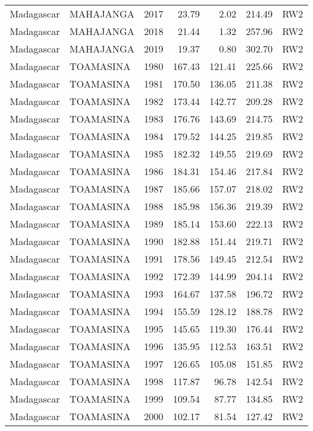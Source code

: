 \begin{longtable}{lllrrrl}
  Madagascar & MAHAJANGA & 2017 & 23.79 & 2.02 & 214.49 & RW2 \\ 
  Madagascar & MAHAJANGA & 2018 & 21.44 & 1.32 & 257.96 & RW2 \\ 
  Madagascar & MAHAJANGA & 2019 & 19.37 & 0.80 & 302.70 & RW2 \\ 
  Madagascar & TOAMASINA & 1980 & 167.43 & 121.41 & 225.66 & RW2 \\ 
  Madagascar & TOAMASINA & 1981 & 170.50 & 136.05 & 211.38 & RW2 \\ 
  Madagascar & TOAMASINA & 1982 & 173.44 & 142.77 & 209.28 & RW2 \\ 
  Madagascar & TOAMASINA & 1983 & 176.76 & 143.69 & 214.75 & RW2 \\ 
  Madagascar & TOAMASINA & 1984 & 179.52 & 144.25 & 219.85 & RW2 \\ 
  Madagascar & TOAMASINA & 1985 & 182.32 & 149.55 & 219.69 & RW2 \\ 
  Madagascar & TOAMASINA & 1986 & 184.31 & 154.46 & 217.84 & RW2 \\ 
  Madagascar & TOAMASINA & 1987 & 185.66 & 157.07 & 218.02 & RW2 \\ 
  Madagascar & TOAMASINA & 1988 & 185.98 & 156.36 & 219.39 & RW2 \\ 
  Madagascar & TOAMASINA & 1989 & 185.14 & 153.60 & 222.13 & RW2 \\ 
  Madagascar & TOAMASINA & 1990 & 182.88 & 151.44 & 219.71 & RW2 \\ 
  Madagascar & TOAMASINA & 1991 & 178.56 & 149.45 & 212.54 & RW2 \\ 
  Madagascar & TOAMASINA & 1992 & 172.39 & 144.99 & 204.14 & RW2 \\ 
  Madagascar & TOAMASINA & 1993 & 164.67 & 137.58 & 196.72 & RW2 \\ 
  Madagascar & TOAMASINA & 1994 & 155.59 & 128.12 & 188.78 & RW2 \\ 
  Madagascar & TOAMASINA & 1995 & 145.65 & 119.30 & 176.44 & RW2 \\ 
  Madagascar & TOAMASINA & 1996 & 135.95 & 112.53 & 163.51 & RW2 \\ 
  Madagascar & TOAMASINA & 1997 & 126.65 & 105.08 & 151.85 & RW2 \\ 
  Madagascar & TOAMASINA & 1998 & 117.87 & 96.78 & 142.54 & RW2 \\ 
  Madagascar & TOAMASINA & 1999 & 109.54 & 87.77 & 134.85 & RW2 \\ 
  Madagascar & TOAMASINA & 2000 & 102.17 & 81.54 & 127.42 & RW2 \\ 

\end{longtable}
